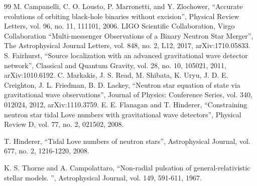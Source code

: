 \documentclass[12pt]{article}
\begin{document}
\begin{thebibliography}{99}
  M. Campanelli, C. O. Lousto, P. Marronetti, and Y. Zlochower,
  ``Accurate evolutions of orbiting black-hole binaries without excision'',
  Physical Review Letters, vol. 96, no. 11, 111101, 2006.
%
  LIGO Scientific Collaboration, Virgo Collaboration
  ``Multi-messenger Observations of a Binary Neutron Star Merger'',
  The Astrophysical Journal Letters, vol. 848, no. 2, L12, 2017,
  arXiv:1710.05833.
  S. Fairhurst,
  ``Source localization with an advanced gravitational wave detector network'',
  Classical and Quantum Gravity, vol. 28, no. 10, 105021, 2011,
  arXiv:1010.6192.
  C. Markakis, J. S. Read, M. Shibata, K. Uryu, J. D. E. Creighton, J. L. Friedman, B. D. Lackey,
  ``Neutron star equation of state via gravitational wave observations'',
  Journal of Physics: Conference Series, vol. 340, 012024, 2012,
  arXiv:1110.3759.
  E. E. Flanagan and T. Hinderer,
  ``Constraining neutron star tidal Love numbers with gravitational wave detectors'',
  Physical Review D, vol. 77, no. 2, 021502, 2008.

  T. Hinderer,
  ``Tidal Love numbers of neutron stars'',
  Astrophysical Journal, vol. 677, no. 2, 1216-1220, 2008.


  K. S. Thorne and A. Campolattaro,
  ``Non-radial pulsation of general-relativistic stellar models. '',
  Astrophysical Journal, vol. 149, 591-611, 1967.


\end{thebibliography}
\end{document}
